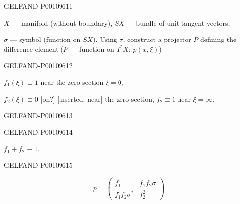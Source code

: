 \begin{GelfandAdjacentEvidence}{GELFAND-P001096}{11}



$X$ — manifold (without boundary), $SX$ — bundle of unit tangent vectors,

$\sigma$ — symbol (function on $SX$). Using $\sigma$, construct a projector $P$ defining the difference element
($P$ — function on $T^*X$; $p(x,\xi)$)

\end{GelfandAdjacentEvidence}
\begin{GelfandAdjacentEvidence}{GELFAND-P001096}{12}


$f_1(\xi)\equiv1$ near the zero section $\xi=0$,

$f_2(\xi)\equiv0$ [\sout{on?}] [inserted: near]
the zero section, $f_2\equiv1$ near $\xi=\infty$.
\end{GelfandAdjacentEvidence}
\begin{GelfandAdjacentEvidence}{GELFAND-P001096}{13}

\end{GelfandAdjacentEvidence}
\begin{GelfandAdjacentEvidence}{GELFAND-P001096}{14}


$f_1+f_2\equiv1$.
\end{GelfandAdjacentEvidence}
\begin{GelfandAdjacentEvidence}{GELFAND-P001096}{15}

\[
p=\begin{pmatrix}
f_1^2&f_1f_2\sigma\\
f_1f_2\sigma^*&f_2^2
\end{pmatrix}
\]
\end{GelfandAdjacentEvidence}

